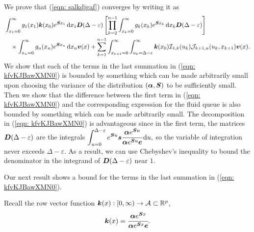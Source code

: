We prove that (\ref{eqn: salkdjgaf}) converges by writing it as
\begin{align}
	&\int_{x_1=0}^\infty g_1(x_1) \bs k(x_0)e^{\bs{S}x_1}\wrt x_1\bs D(\Delta-\varepsilon)
			\left[\prod_{k=2}^{n-1}\int_{x_k=0}^\infty g_k(x_k) e^{\bs{S}x_k} \wrt x_k \bs D(\Delta-\varepsilon)\right] \nonumber 
			\\&\quad \times\int_{x_n=0}^\infty g_{n}(x_n) e^{\bs{S}x_n} \wrt x_n {\bs v}(x)  
%
+\sum_{k=1}^{n-1} \int_{x_{k+1}=0}^\infty \int_{u_k=\Delta-\varepsilon}^\infty \bs k(x_0)\mathcal I_{1,k}(u_k) \mathcal J_{k+1,n}(u_k,x_{k+1}){\bs v}(x). \label{eqn: kfvKJBawXMN0}
\end{align}
We show that each of the terms in the last summation in (\ref{eqn: kfvKJBawXMN0}) is bounded by something which can be made arbitrarily small upon choosing the variance of the distribution \((\boldsymbol \alpha, \boldsymbol S)\) to be sufficiently small. Then we show that the difference between the first term in (\ref{eqn: kfvKJBawXMN0}) and the corresponding expression for the fluid queue is also bounded by something which can be made arbitrarily small. The decomposition in (\ref{eqn: kfvKJBawXMN0}) is advantageous since in the first term, the matrices \(\boldsymbol D(\Delta-\varepsilon)\) are the integrals \(\displaystyle \int_{u=0}^{\Delta-\varepsilon}e^{\boldsymbol Su}\boldsymbol s \cfrac{\boldsymbol\alpha e^{\boldsymbol S u}}{\boldsymbol \alpha e^{\boldsymbol S u}\boldsymbol e} \, \mathrm{d} u,\) so the variable of integration never exceeds \(\Delta-\varepsilon\). As a result, we can use Chebyshev's inequality to bound the denominator in the integrand of \(\boldsymbol D(\Delta-\varepsilon)\) near \(1\). 

Our next result shows a bound for the terms in the last summation in (\ref{eqn: kfvKJBawXMN0}). 

Recall the row vector function \(\boldsymbol k(x): [0,\infty)\to \mathcal A \subset \mathbb R^p\),
\[\boldsymbol k(x) = \cfrac{\boldsymbol \alpha e^{\boldsymbol Sx}}{\boldsymbol \alpha e^{\boldsymbol Sx}\boldsymbol e}.\]

